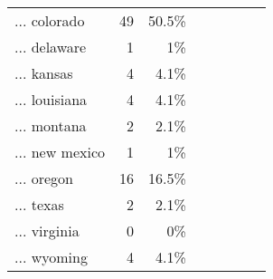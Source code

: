 \begin{table}[!htbp]
{\begin{tabular}{lrrrrrrr}
... colorado & 49 & 50.5\% &  &  &  &  &  \\ 
... delaware & 1 & 1\% &  &  &  &  &  \\ 
... kansas & 4 & 4.1\% &  &  &  &  &  \\ 
... louisiana & 4 & 4.1\% &  &  &  &  &  \\ 
... montana & 2 & 2.1\% &  &  &  &  &  \\ 
... new mexico & 1 & 1\% &  &  &  &  &  \\ 
... oregon & 16 & 16.5\% &  &  &  &  &  \\ 
... texas & 2 & 2.1\% &  &  &  &  &  \\ 
... virginia & 0 & 0\% &  &  &  &  &  \\ 
... wyoming & 4 & 4.1\% &  &  &  &  & \\ 
\hline
\hline
\end{tabular}
}
\end{table}

